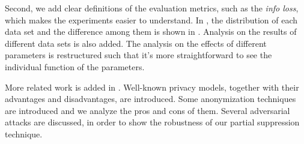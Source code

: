 Second, we add clear definitions of the evaluation metrics, such as the \emph{info loss},
which makes the experiments easier to understand.
In , the distribution of each data set and the difference among them
is shown in .
Analysis on the results of different data sets is also added.
The analysis on the effects of different parameters is restructured such that
it's more straightforward to see the individual function of the parameters.

More related work is added in .
Well-known privacy models, together with their advantages and disadvantages, are introduced.
Some anonymization techniques are introduced and we analyze the pros and cons of them.
Several adversarial attacks are discussed,
in order to show the robustness of our partial suppression technique.
